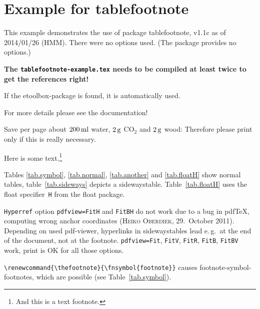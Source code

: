 \documentclass[british]{article}[2007/10/19]%
\gdef\unit#1{\mathord{\thinspace\mathrm{#1}}}%
\begin{document}
\section*{Example for tablefootnote}

This example demonstrates the use of package\newline
\textsf{tablefootnote}, v1.1c as of 2014/01/26 (HMM).\newline
There were no options used. (The package provides no options.)\newline

\textbf{The \texttt{tablefootnote-example.tex} needs to be compiled
at least twice to get the references right!}\newline

If the etoolbox-package is found, it is automatically used.\newline

For more details please see the documentation!\newline

\noindent Save per page about $200\unit{ml}$ water,
$2\unit{g}$ CO$_{2}$ and $2\unit{g}$ wood:\newline
Therefore please print only if this is really necessary.\newline

Here is some text.\footnote{And this is a text footnote.}\newline

Tables \ref{tab.symbol}, \ref{tab.normal}, \ref{tab.another} and
\ref{tab.floatH} show normal tables, table~\ref{tab.sideways} depicts
a sidewaystable. Table~\ref{tab.floatH} uses the float
specifier~\texttt{H} from the float package.\newline

\texttt{Hyperref} option \verb|pdfview=FitH| and \verb|FitBH| do
not work due to a bug in pdf\TeX{}, computing wrong
anchor coordinates (\textsc{Heiko Oberdiek}, 29.~October 2011).
Depending on used pdf-viewer, hyperlinks in sidewaystables lead
e.\,g.~at the end of the document, not at the footnote.
\verb|pdfview=Fit|, \verb|FitV|, \verb|FitR|, \verb|FitB|,
\verb|FitBV| work, print is OK for all those options.

\bigskip

\listoftables

\pagebreak

\renewcommand{\thefootnote}{\fnsymbol{footnote}}
\verb|\renewcommand{\thefootnote}{\fnsymbol{footnote}}|
causes footnote{-}symbol{-}footnotes, which are possible
(see Table~\ref{tab.symbol}).
\end{document}
